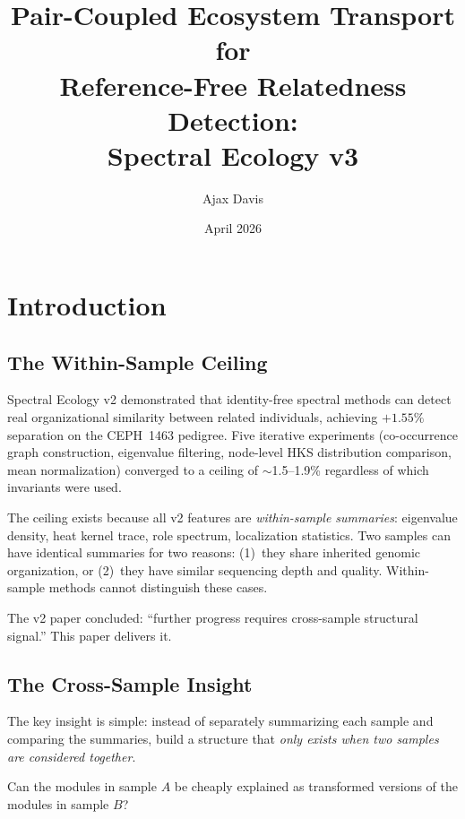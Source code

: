 \documentclass{../yalumba}
\title{Pair-Coupled Ecosystem Transport for\\Reference-Free Relatedness Detection:\\Spectral Ecology v3}
\author{Ajax Davis}
\date{April 2026}
\begin{document}
\maketitle

\tableofcontents
\newpage


\section{Introduction}
\label{sec:intro}

\subsection{The Within-Sample Ceiling}

Spectral Ecology v2 demonstrated that identity-free spectral methods can
detect real organizational similarity between related individuals, achieving
$+1.55\%$ separation on the CEPH~1463 pedigree.  Five iterative experiments
(co-occurrence graph construction, eigenvalue filtering, node-level HKS
distribution comparison, mean normalization) converged to a ceiling of
$\sim$1.5--1.9\% regardless of which invariants were used.


The ceiling exists because all v2 features are \emph{within-sample summaries}:
eigenvalue density, heat kernel trace, role spectrum, localization statistics.
Two samples can have identical summaries for two reasons: (1)~they share
inherited genomic organization, or (2)~they have similar sequencing depth and
quality.  Within-sample methods cannot distinguish these cases.

The v2 paper concluded: ``further progress requires cross-sample structural
signal.''  This paper delivers it.

\subsection{The Cross-Sample Insight}

The key insight is simple: instead of separately summarizing each sample and
comparing the summaries, build a structure that \emph{only exists when two
samples are considered together}.

\begin{pullquote}
Can the modules in sample $A$ be cheaply explained as transformed versions
of the modules in sample $B$?
\end{pullquote}
\end{document}

